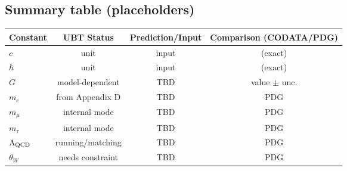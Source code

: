 \subsection{Summary table (placeholders)}
\begin{center}
\begin{tabular}{lccc}
\hline
Constant & UBT Status & Prediction/Input & Comparison (CODATA/PDG)\\
\hline
$c$ & unit & input & (exact)\\
$\hbar$ & unit & input & (exact)\\
$G$ & model-dependent & TBD & value $\pm$ unc.\\
$m_e$ & from Appendix D & TBD & PDG\\
$m_\mu$ & internal mode & TBD & PDG\\
$m_\tau$ & internal mode & TBD & PDG\\
$\Lambda_{\rm QCD}$ & running/matching & TBD & PDG\\
$\theta_W$ & needs constraint & TBD & PDG\\
\hline
\end{tabular}
\end{center}
